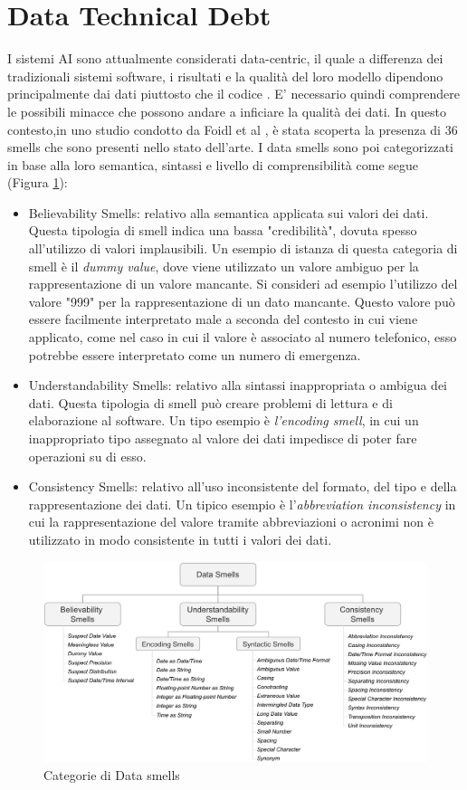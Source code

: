 \section{Data Technical Debt}
I sistemi AI sono attualmente considerati data-centric, il quale a differenza dei tradizionali sistemi software, i risultati e la qualità del loro modello dipendono principalmente dai dati piuttosto che il codice \cite{KhomhSE4ML}.
E' necessario quindi comprendere le possibili minacce che possono andare a inficiare la qualità dei dati.
In questo contesto,in uno studio condotto da Foidl et al \cite{FoidlDataSmells}, è stata scoperta la presenza di 36 smells che sono presenti nello stato dell'arte. 
I data smells sono poi categorizzati in base alla loro semantica, sintassi e livello di comprensibilità come segue (Figura \ref{fig:data_smells}):
\begin{itemize}
    \item Believability Smells: relativo alla semantica applicata sui valori dei dati. Questa tipologia di smell indica una bassa "credibilità", dovuta spesso all'utilizzo di valori implausibili. Un esempio di istanza di questa categoria di smell è il \textit{dummy value}, dove viene utilizzato un valore ambiguo per la rappresentazione di un valore mancante. Si consideri ad esempio l'utilizzo del valore "999" per la rappresentazione di un dato mancante. Questo valore può essere facilmente interpretato male a seconda del contesto in cui viene applicato, come nel caso in cui il valore è associato al numero telefonico, esso potrebbe essere interpretato come un numero di emergenza.
    \item Understandability Smells: relativo alla sintassi inappropriata o ambigua dei dati. Questa tipologia di smell può creare problemi di lettura e di elaborazione al software. Un tipo esempio è \textit{l'encoding smell}, in cui un inappropriato tipo assegnato al valore dei dati impedisce di poter fare operazioni su di esso.
    \item Consistency Smells: relativo all'uso inconsistente del formato, del tipo e della rappresentazione dei dati. Un tipico esempio è l'\textit{abbreviation inconsistency} in cui la rappresentazione del valore tramite abbreviazioni o acronimi non è utilizzato in modo consistente in tutti i valori dei dati.
\end{itemize}
\begin{figure}[h]
    \centering
    \includegraphics[width=\textwidth]{Figure/StateofArt/data_smell_categories.png}
    \caption{Categorie di Data smells}
    \label{fig:data_smells}
\end{figure}

